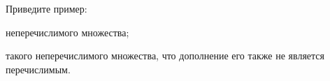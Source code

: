 Приведите пример:
\begin{enumcyr}
    \item неперечислимого множества;
    \item такого неперечислимого множества, что дополнение его также не является перечислимым.
\end{enumcyr}